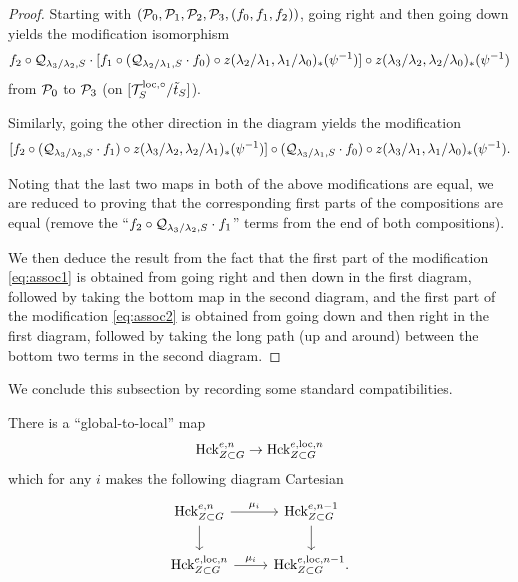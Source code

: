 \begin{proof}
Starting with $(\mathcal{P}_{0}, \mathcal{P}_{1}, \mathcal{P}_{2}, \mathcal{P}_{3}, (f_{0},f_{1},f_{2}))$, going right and then going down yields the modification isomorphism
\begin{equation}\label{eq:assoc1}
     f_{2} \circ \mathcal{Q}_{\lambda_{3}/\lambda_{2},S} \cdot [f_{1} \circ (\mathcal{Q}_{\lambda_{2}/\lambda_{1},S} \cdot f_{0}) \circ z(\lambda_{2}/\lambda_{1}, \lambda_{1}/\lambda_{0})_{*}(\psi^{-1})] \circ z(\lambda_{3}/\lambda_{2},\lambda_{2}/\lambda_{0})_{*}(\psi^{-1})
\end{equation}
from $\mathcal{P}_{0}$ to $\mathcal{P}_{3}$ (on $[\mathcal{T}_{S}^{\mathrm{loc},\circ}/\tilde{t}_{S}]$).

Similarly, going the other direction in the diagram yields the modification
\begin{equation}\label{eq:assoc2}
[f_{2} \circ (\mathcal{Q}_{\lambda_{3}/\lambda_{2},S} \cdot f_{1}) \circ z(\lambda_{3}/\lambda_{2},\lambda_{2}/\lambda_{1})_{*}(\psi^{-1})] \circ (\mathcal{Q}_{\lambda_{3}/\lambda_{1},S} \cdot f_{0}) \circ z(\lambda_{3}/\lambda_{1},\lambda_{1}/\lambda_{0})_{*}(\psi^{-1}).
\end{equation}

Noting that the last two maps in both of the above modifications are equal, we are reduced to proving that the corresponding first parts of the compositions are equal (remove the ``$f_{2} \circ \mathcal{Q}_{\lambda_{3}/\lambda_{2},S} \cdot f_{1}$'' terms from the end of both compositions). 

We then deduce the result from the fact that the first part of the modification \eqref{eq:assoc1} is obtained from going right and then down in the first diagram, followed by taking the bottom map in the second diagram, and the first part of the modification \eqref{eq:assoc2} is obtained from going down and then right in the first diagram, followed by taking the long path (up and around) between the bottom two terms in the second diagram. 
\end{proof}

We conclude this subsection by recording some standard compatibilities. 

\begin{prop}\label{prop:hckloc}
    There is a ``global-to-local'' map
    \begin{equation*}
        \textnormal{Hck}_{Z \subset G}^{e,n} \to \textnormal{Hck}_{Z \subset G}^{e,\mathrm{loc},n}
    \end{equation*}
    which for any $i$ makes the following diagram Cartesian
    \[
    \begin{tikzcd}
        \tn{Hck}_{Z \subset G}^{e,n} \arrow["\mu_{i}"]{r} \arrow{d} & \tn{Hck}_{Z \subset G}^{e,n-1} \arrow{d} \\
        \tn{Hck}_{Z \subset G}^{e,\loc,n}  \arrow["\mu_{i}"]{r}  & \tn{Hck}_{Z \subset G}^{
    e,\loc,n-1}.
    \end{tikzcd}
    \]
\end{prop}

